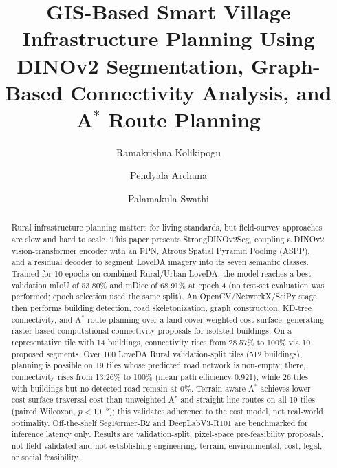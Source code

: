 \documentclass[runningheads]{llncs}
\begin{document}
%
\title{GIS-Based Smart Village Infrastructure Planning Using DINOv2 Segmentation, Graph-Based Connectivity Analysis, and A$^{*}$ Route Planning}
%
%
\author{Ramakrishna Kolikipogu\and Pendyala Archana\and Palamakula Swathi}
%
%
%
\maketitle
%
\begin{abstract}
Rural infrastructure planning matters for living standards, but field-survey approaches are slow and hard to scale. This paper presents StrongDINOv2Seg, coupling a DINOv2 vision-transformer encoder with an FPN, Atrous Spatial Pyramid Pooling (ASPP), and a residual decoder to segment LoveDA imagery into its seven semantic classes. Trained for 10 epochs on combined Rural/Urban LoveDA, the model reaches a best validation mIoU of 53.80\% and mDice of 68.91\% at epoch 4 (no test-set evaluation was performed; epoch selection used the same split). An OpenCV/NetworkX/SciPy stage then performs building detection, road skeletonization, graph construction, KD-tree connectivity, and A$^{*}$ route planning over a land-cover-weighted cost surface, generating raster-based computational connectivity proposals for isolated buildings. On a representative tile with 14 buildings, connectivity rises from 28.57\% to 100\% via 10 proposed segments. Over 100 LoveDA Rural validation-split tiles (512 buildings), planning is possible on 19 tiles whose predicted road network is non-empty; there, connectivity rises from 13.26\% to 100\% (mean path efficiency 0.921), while 26 tiles with buildings but no detected road remain at 0\%. Terrain-aware A$^{*}$ achieves lower cost-surface traversal cost than unweighted A$^{*}$ and straight-line routes on all 19 tiles (paired Wilcoxon, $p<10^{-5}$); this validates adherence to the cost model, not real-world optimality. Off-the-shelf SegFormer-B2 and DeepLabV3-R101 are benchmarked for inference latency only. Results are validation-split, pixel-space pre-feasibility proposals, not field-validated and not establishing engineering, terrain, environmental, cost, legal, or social feasibility.
\end{abstract}
%
\end{document}
